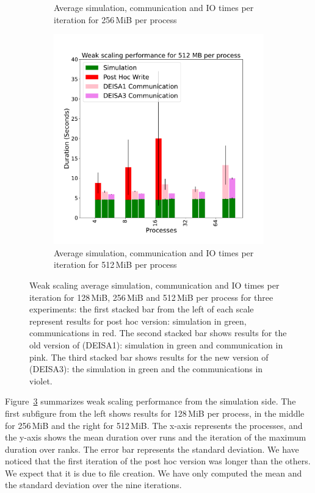 \begin{figure}
\begin{subfigure}[b]{0.3\textwidth}
         \caption{Average simulation, communication and IO times per iteration for 256\,MiB per process}
         \label{fig:X256_1_3_p}
     \end{subfigure}
     \hfill
     \begin{subfigure}[b]{0.3\textwidth}
         \centering
         \includegraphics[width=\textwidth, height=\textwidth]{figures/512MB_1vs3vspost1vspost2.pdf}
         \caption{Average simulation, communication and IO times per iteration for 512\,MiB per process}
         \label{fig:X512_1_3_p}
     \end{subfigure}
        \caption{Weak scaling average simulation, communication and IO times per iteration for 128\,MiB, 256\,MiB and 512\,MiB per process for three experiments: the first stacked bar from the left of each scale represent results for post hoc version: simulation in green, communications in red. The second stacked bar shows results for the old version of \deisa (DEISA1): simulation in green and communication in pink. The third stacked bar shows results for the new version of \deisa (DEISA3): the simulation in green and the communications in violet.}
        \label{fig:perfX4}
\end{figure}

Figure~\ref{fig:perfX4} summarizes weak scaling performance from the simulation side. The first subfigure from the left shows results for 128\,MiB per process, in the middle for 256\,MiB and the right for 512\,MiB. 
The x-axis represents the processes, and the y-axis shows the mean duration over runs and the iteration of the maximum duration over ranks. The error bar represents the standard deviation. We have noticed that the first iteration of the post hoc version was longer than the others. We expect that it is due to file creation. We have only computed the mean and the standard deviation over the nine iterations. 

